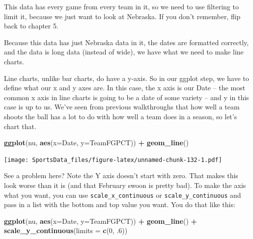 \documentclass[]{book}
\newenvironment{Shaded}{\begin{snugshade}}{\end{snugshade}}
\newcommand{\DataTypeTok}[1]{\textcolor[rgb]{0.13,0.29,0.53}{#1}}
\newcommand{\DecValTok}[1]{\textcolor[rgb]{0.00,0.00,0.81}{#1}}
\newcommand{\FloatTok}[1]{\textcolor[rgb]{0.00,0.00,0.81}{#1}}
\newcommand{\KeywordTok}[1]{\textcolor[rgb]{0.13,0.29,0.53}{\textbf{#1}}}
\newcommand{\NormalTok}[1]{#1}
\newcommand{\OperatorTok}[1]{\textcolor[rgb]{0.81,0.36,0.00}{\textbf{#1}}}
\newcommand{\StringTok}[1]{\textcolor[rgb]{0.31,0.60,0.02}{#1}}
\begin{document}
This data has every game from every team in it, so we need to use filtering to limit it, because we just want to look at Nebraska. If you don't remember, flip back to chapter 5.

\begin{Shaded}
\end{Shaded}

Because this data has just Nebraska data in it, the dates are formatted correctly, and the data is long data (instead of wide), we have what we need to make line charts.

Line charts, unlike bar charts, do have a y-axis. So in our ggplot step, we have to define what our x and y axes are. In this case, the x axis is our Date -- the most common x axis in line charts is going to be a date of some variety -- and y in this case is up to us. We've seen from previous walkthroughs that how well a team shoots the ball has a lot to do with how well a team does in a season, so let's chart that.

\begin{Shaded}
\begin{Highlighting}[]
\KeywordTok{ggplot}\NormalTok{(nu, }\KeywordTok{aes}\NormalTok{(}\DataTypeTok{x=}\NormalTok{Date, }\DataTypeTok{y=}\NormalTok{TeamFGPCT)) }\OperatorTok{+}\StringTok{ }\KeywordTok{geom_line}\NormalTok{()}
\end{Highlighting}
\end{Shaded}

\texttt{[image: SportsData\_files/figure-latex/unnamed-chunk-132-1.pdf]}

See a problem here? Note the Y axis doesn't start with zero. That makes this look worse than it is (and that February swoon is pretty bad). To make the axis what you want, you can use \texttt{scale\_x\_continuous} or \texttt{scale\_y\_continuous} and pass in a list with the bottom and top value you want. You do that like this:

\begin{Shaded}
\begin{Highlighting}[]
\KeywordTok{ggplot}\NormalTok{(nu, }\KeywordTok{aes}\NormalTok{(}\DataTypeTok{x=}\NormalTok{Date, }\DataTypeTok{y=}\NormalTok{TeamFGPCT)) }\OperatorTok{+}\StringTok{ }\KeywordTok{geom_line}\NormalTok{() }\OperatorTok{+}\StringTok{ }\KeywordTok{scale_y_continuous}\NormalTok{(}\DataTypeTok{limits =} \KeywordTok{c}\NormalTok{(}\DecValTok{0}\NormalTok{, }\FloatTok{.6}\NormalTok{))}
\end{Highlighting}
\end{Shaded}
\end{document}
